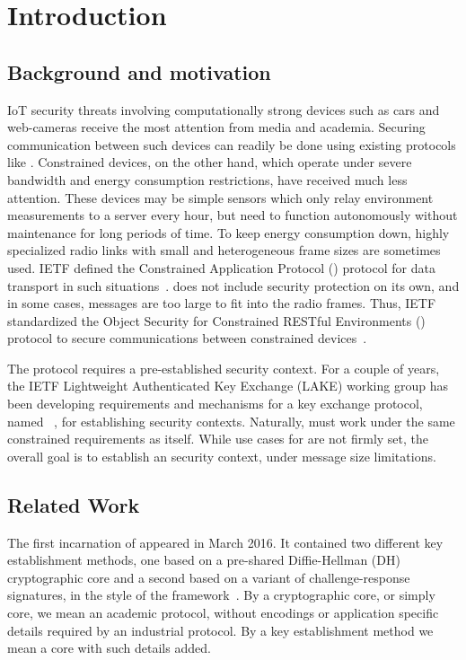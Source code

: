 \documentclass[runningheads, envcountsame, a4paper, draft, x11names]{llncs}
\begin{document}
\section{Introduction}
\label{sec:introduction}

\subsection{Background and motivation}
\label{sec:motivation}
IoT security threats involving computationally strong devices such as cars
and web-cameras receive the most attention from media and academia.
%
Securing communication between such devices can readily be done using existing
protocols like \mDandTls.
%
Constrained devices, on the other hand, which operate under severe bandwidth
and energy consumption restrictions, have received much less attention.
%
These devices may be simple sensors which only relay environment
measurements to a server every hour, but need to function autonomously without
maintenance for long periods of time.
%
To keep energy consumption down, highly specialized radio links with small
and heterogeneous frame sizes are sometimes used.
%
IETF defined the Constrained Application Protocol (\mCoap{}) protocol for data
transport in such situations~\cite{rfc7252}.
%
\mCoap{} does not include security protection on its own, and in some cases,
\mDandTls{} messages are too large to fit into the radio frames.
%
Thus, IETF standardized the Object Security for Constrained RESTful Environments
(\mOscore{}) protocol to secure communications between constrained
devices~\cite{rfc8613}.
%

The \mOscore{} protocol requires a pre-established security context.
%
For a couple of years, the IETF Lightweight Authenticated Key Exchange (LAKE)
working group has been developing requirements and mechanisms for a key
exchange protocol, named \mEdhoc~\cite{selander-lake-edhoc-01}, for
establishing \mOscore{} security contexts.
%
Naturally, \mEdhoc{} must work under the same constrained requirements as
\mOscore{} itself.
%
While use cases for \mEdhoc{} are not firmly set, the overall goal is to
establish an \mOscore{} security context, under message size limitations.
%

\subsection{Related Work}
\label{sec:relatedWork}
%
The first incarnation of \mEdhoc{} appeared in March 2016.
%
It contained two different key establishment methods, one based on a
pre-shared Diffie-Hellman (DH) cryptographic core and a second based on a
variant of challenge-response signatures, in the style of the \mNoise{}
framework~\cite{perrin2016noise}.
%
By a cryptographic core, or simply core, we mean an academic protocol, without
encodings or application specific details required by an industrial protocol.
%
By a key establishment method we mean a core with such details added.
%
\end{document}
